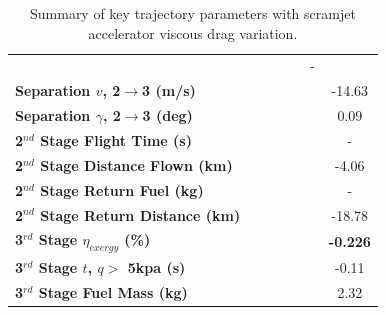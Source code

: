 \begin{table}[ht]
\begin{tabular}{l c c c c c c}
		& \secondthirdSeparationAltvCdFifty
		& \secondthirdSeparationAltvCdStandard
		& \secondthirdSeparationAltvCdOneHundredSeven
		& \secondthirdSeparationAltvCdOneHundredFifteen
		& -
		\\
		\textbf{Separation $v$, 2$\rightarrow$3 (m/s)}
		& \secondthirdSeparationvvCdTwenty
		& \secondthirdSeparationvvCdFifty
		& \secondthirdSeparationvvCdStandard
		& \secondthirdSeparationvvCdOneHundredSeven
		& \secondthirdSeparationvvCdOneHundredFifteen
		&-14.63
		\\
		\textbf{Separation $\gamma$, 2$\rightarrow$3 (deg)}
		& \secondthirdSeparationgammavCdTwenty
		& \secondthirdSeparationgammavCdFifty
		& \secondthirdSeparationgammavCdStandard
		& \secondthirdSeparationgammavCdOneHundredSeven
		& \secondthirdSeparationgammavCdOneHundredFifteen
		&0.09
		\\
		\textbf{2$^{nd}$ Stage Flight Time (s)}
		& \secondFlightTimevCdTwenty
		& \secondFlightTimevCdFifty
		& \secondFlightTimevCdStandard
		& \secondFlightTimevCdOneHundredSeven
		& \secondFlightTimevCdOneHundredFifteen
		& -
		\\
		\textbf{2$^{nd}$ Stage Distance Flown (km)}
		& \SecondDistvCdTwenty
		& \SecondDistvCdFifty
		& \SecondDistvCdStandard
		& \SecondDistvCdOneHundredSeven
		& \SecondDistvCdOneHundredFifteen
		&-4.06
		\\
		\textbf{2$^{nd}$ Stage Return Fuel (kg)}
		& \returnFuelvCdTwenty
		& \returnFuelvCdFifty
		& \returnFuelvCdStandard
		& \returnFuelvCdOneHundredSeven
		& \returnFuelvCdOneHundredFifteen
		& -
		\\
		\textbf{2$^{nd}$ Stage Return Distance (km)}
		& \returnDistvCdTwenty
		& \returnDistvCdFifty
		& \returnDistvCdStandard
		& \returnDistvCdOneHundredSeven
		& \returnDistvCdOneHundredFifteen
		&-18.78
		\\
		\hline 
		\textbf{3$^{rd}$ Stage $\eta_{exergy}$ (\%)}
		& \textbf{\thirddExergyEffvCdTwenty}
		& \textbf{\thirddExergyEffvCdFifty}
		& \textbf{\thirddExergyEffvCdStandard}
		& \textbf{\thirddExergyEffvCdOneHundredSeven}
		& \textbf{\thirddExergyEffvCdOneHundredFifteen}
		& \textbf{-0.226}
		\\
		\textbf{3$^{rd}$ Stage $t$, $q >$ 5kpa (s)}
		& \thirdqOverFivevCdTwenty
		& \thirdqOverFivevCdFifty
		& \thirdqOverFivevCdStandard
		& \thirdqOverFivevCdOneHundredSeven
		& \thirdqOverFivevCdOneHundredFifteen
		&-0.11
		\\
		\textbf{3$^{rd}$ Stage Fuel Mass (kg)}
		& \thirdmFuelvCdTwenty
		& \thirdmFuelvCdFifty
		& \thirdmFuelvCdStandard
		& \thirdmFuelvCdOneHundredSeven
		& \thirdmFuelvCdOneHundredFifteen
		&2.32
		\\
		\hline 
	\end{tabular} 
	\caption{Summary of key trajectory parameters with scramjet accelerator viscous drag variation.}
	\label{tab:viscous}
\end{table} 


